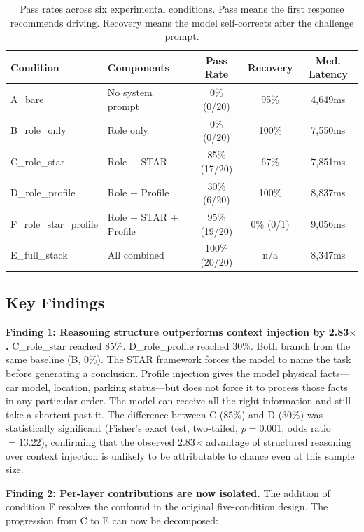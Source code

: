 \documentclass[11pt]{article}
\begin{document}
\begin{table}[H]
\centering
\begin{tabular}{llccc}
\toprule
\textbf{Condition} & \textbf{Components} & \textbf{Pass Rate} & \textbf{Recovery} & \textbf{Med. Latency} \\
\midrule
A\_bare & No system prompt & 0\% (0/20) & 95\% & 4,649ms \\
B\_role\_only & Role only & 0\% (0/20) & 100\% & 7,550ms \\
C\_role\_star & Role + STAR & 85\% (17/20) & 67\% & 7,851ms \\
D\_role\_profile & Role + Profile & 30\% (6/20) & 100\% & 8,837ms \\
F\_role\_star\_profile & Role + STAR + Profile & 95\% (19/20) & 0\% (0/1) & 9,056ms \\
E\_full\_stack & All combined & 100\% (20/20) & n/a & 8,347ms \\
\bottomrule
\end{tabular}
\caption{Pass rates across six experimental conditions. Pass means the first response recommends driving. Recovery means the model self-corrects after the challenge prompt.}
\label{tab:results}
\end{table}

\subsection{Key Findings}

\textbf{Finding 1: Reasoning structure outperforms context injection by 2.83$\times$.} C\_role\_star reached 85\%. D\_role\_profile reached 30\%. Both branch from the same baseline (B, 0\%). The STAR framework forces the model to name the task before generating a conclusion. Profile injection gives the model physical facts---car model, location, parking status---but does not force it to process those facts in any particular order. The model can receive all the right information and still take a shortcut past it. The difference between C (85\%) and D (30\%) was statistically significant (Fisher's exact test, two-tailed, $p = 0.001$, odds ratio $= 13.22$), confirming that the observed 2.83$\times$ advantage of structured reasoning over context injection is unlikely to be attributable to chance even at this sample size.

\textbf{Finding 2: Per-layer contributions are now isolated.} The addition of condition F resolves the confound in the original five-condition design. The progression from C to E can now be decomposed:
\end{document}
